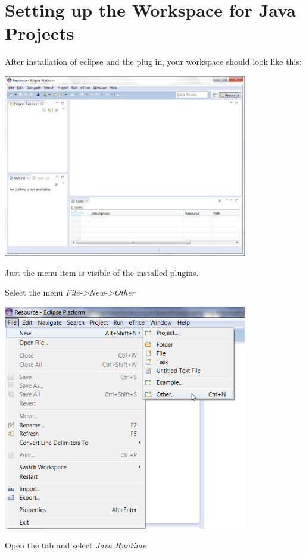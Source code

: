 \section{Setting up the Workspace for Java Projects}

After installation of eclipse and the \eTrice{} plug in, your workspace should look like this:  

\includegraphics[width=0.8\textwidth]{images/013-SetupWorkspace01.png}

Just the \textit{\eTrice{}} menu item is visible of the installed \eTrice{} plugins.

Select the menu \emph{File->New->Other}

\includegraphics[width=0.8\textwidth]{images/013-SetupWorkspace02.png}

Open the \textit{\eTrice{}} tab and select \textit{\eTrice{} Java Runtime}

